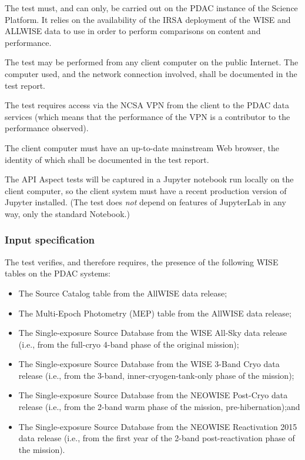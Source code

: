 The test must, and can only, be carried out on the PDAC instance of the Science Platform.
It relies on the availability of the IRSA deployment of the WISE and ALLWISE data to use in order to perform comparisons on content and performance.

The test may be performed from any client computer on the public Internet.
The computer used, and the network connection involved, shall be documented in the test report.

The test requires access via the NCSA VPN from the client to the PDAC data services 
(which means that the performance of the VPN is a contributor to the performance observed).

The client computer must have an up-to-date mainstream Web browser, the identity of which shall be documented in the test report.

The API Aspect tests will be captured in a Jupyter notebook run locally on the client computer, so the client system must have a recent production version of Jupyter installed.
(The test does \emph{not} depend on features of JupyterLab in any way, only the standard Notebook.)


\subsubsection{Input specification}

The test verifies, and therefore requires, the presence of the following WISE tables on the PDAC systems:

\begin{itemize}

  \item{The Source Catalog table from the AllWISE data release;}
  \item{The Multi-Epoch Photometry (MEP) table from the AllWISE data release;}
  \item{The Single-exposure Source Database from the WISE All-Sky data release (i.e., from the full-cryo 4-band phase of the original mission);}
  \item{The Single-exposure Source Database from the WISE 3-Band Cryo data release (i.e., from the 3-band, inner-cryogen-tank-only phase of the mission);}
  \item{The Single-exposure Source Database from the NEOWISE Post-Cryo data release (i.e., from the 2-band warm phase of the mission, pre-hibernation);and}
  \item{The Single-exposure Source Database from the NEOWISE Reactivation 2015 data release (i.e., from the first year of the 2-band post-reactivation phase of the mission).}
\end{itemize}


